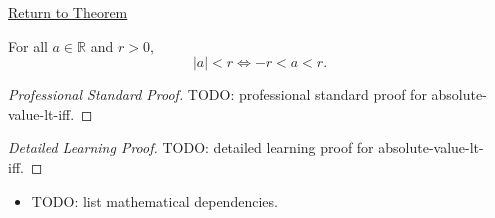 \newpage
{}
\label{prf:absolute-value-lt-iff}

\begin{remark*}[Return]
\hyperref[thm:absolute-value-lt-iff]{Return to Theorem}
\end{remark*}

\begin{theorem*}
For all $a \in \mathbb{R}$ and $r > 0$,
\[
  \lvert a \rvert < r \iff -r < a < r.
\]
\end{theorem*}

\begin{proof}[Professional Standard Proof]
\LRAProofBodyStart
TODO: professional standard proof for absolute-value-lt-iff.
\end{proof}

\begin{proof}[Detailed Learning Proof]
\LRAProofBodyStart
TODO: detailed learning proof for absolute-value-lt-iff.
\end{proof}

\begin{remark*}
\end{remark*}

\begin{dependencies}
\begin{itemize}
  \item TODO: list mathematical dependencies.
\end{itemize}
\end{dependencies}

\clearpage
